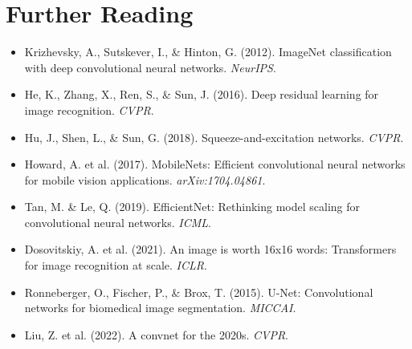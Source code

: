 \section{Further Reading}

\begin{itemize}
    \item Krizhevsky, A., Sutskever, I., \& Hinton, G. (2012). ImageNet classification with deep convolutional neural networks. \textit{NeurIPS}.
    \item He, K., Zhang, X., Ren, S., \& Sun, J. (2016). Deep residual learning for image recognition. \textit{CVPR}.
    \item Hu, J., Shen, L., \& Sun, G. (2018). Squeeze-and-excitation networks. \textit{CVPR}.
    \item Howard, A. et al. (2017). MobileNets: Efficient convolutional neural networks for mobile vision applications. \textit{arXiv:1704.04861}.
    \item Tan, M. \& Le, Q. (2019). EfficientNet: Rethinking model scaling for convolutional neural networks. \textit{ICML}.
    \item Dosovitskiy, A. et al. (2021). An image is worth 16x16 words: Transformers for image recognition at scale. \textit{ICLR}.
    \item Ronneberger, O., Fischer, P., \& Brox, T. (2015). U-Net: Convolutional networks for biomedical image segmentation. \textit{MICCAI}.
    \item Liu, Z. et al. (2022). A convnet for the 2020s. \textit{CVPR}.
\end{itemize}

